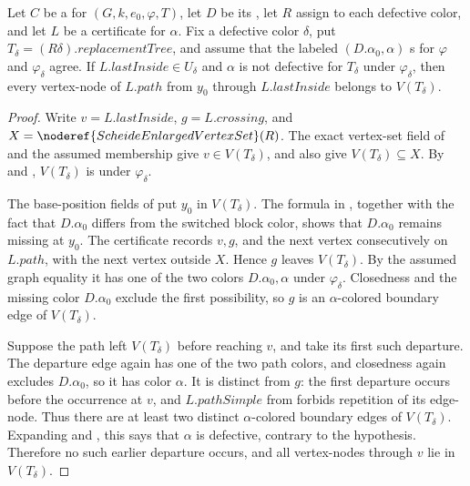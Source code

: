 \begin{helper}
Let $C$ be a  for
$(G,k,e_0,\varphi,T)$, let $D$ be its
, let $R$ assign
 to each defective color, and let $L$ be
a  certificate for $\alpha$.  Fix a
defective color $\delta$, put
$T_\delta=(R\delta).\mathit{replacementTree}$, and assume that the
labeled $(D.\alpha_0,\alpha)$ s for $\varphi$ and
$\varphi_\delta$ agree.  If $L.\mathit{lastInside}\in U_\delta$ and
$\alpha$ is not defective for $T_\delta$ under $\varphi_\delta$, then
every vertex-node of $L.path$ from $y_0$ through
$L.\mathit{lastInside}$ belongs to $V(T_\delta)$.
\end{helper}
\begin{proof}
Write $v=L.\mathit{lastInside}$, $g=L.\mathit{crossing}$, and
$X=\noderef{ScheideEnlargedVertexSet}(R)$.  The exact vertex-set field of
 and the assumed membership give
$v\in V(T_\delta)$, and also give $V(T_\delta)\subseteq X$.  By
 and
, $V(T_\delta)$ is
 under $\varphi_\delta$.

The base-position fields of
 put $y_0$ in
$V(T_\delta)$.  The formula in
, together with the fact that
$D.\alpha_0$ differs from the switched block color, shows that
$D.\alpha_0$ remains missing at $y_0$.  The certificate
 records $v,g$, and the next vertex
consecutively on $L.path$, with the next vertex outside $X$.  Hence $g$
leaves $V(T_\delta)$.  By the assumed graph equality it has one of the
two colors $D.\alpha_0,\alpha$ under $\varphi_\delta$.  Closedness and the
missing color $D.\alpha_0$ exclude the first possibility, so $g$ is an
$\alpha$-colored boundary edge of $V(T_\delta)$.

Suppose the path left $V(T_\delta)$ before reaching $v$, and take its
first such departure.  The departure edge again has one of the two path
colors, and closedness again excludes $D.\alpha_0$, so it has color
$\alpha$.  It is distinct from $g$: the first departure occurs before
the occurrence at $v$, and $L.pathSimple$ from
 forbids repetition of its edge-node.  Thus
there are at least two distinct $\alpha$-colored boundary edges of
$V(T_\delta)$.  Expanding  and
, this says that $\alpha$ is defective, contrary
to the hypothesis.  Therefore no such earlier departure occurs, and all
vertex-nodes through $v$ lie in $V(T_\delta)$.
\end{proof}
